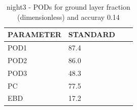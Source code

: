 \begin{table}[p!]
\begin{center}
\begin{tabular}{|l|l|l|l|}
\hline
\multicolumn{1}{|c|}{\cellcolor[HTML]{C0C0C0}\textbf{PARAMETER}} & \multicolumn{1}{c|}{\cellcolor[HTML]{C0C0C0}\textbf{STANDARD}} \\
\hline
\cellcolor[HTML]{C0C0C0}POD1  & 87.4                                \\
\cellcolor[HTML]{C0C0C0}POD2  & 86.0                                \\
\cellcolor[HTML]{C0C0C0}POD3  & 48.3                                \\
\cellcolor[HTML]{C0C0C0}PC    & 77.5                                  \\
\cellcolor[HTML]{C0C0C0}EBD   & 17.2                                 \\
\hline
\end{tabular}
\caption{night3 - PODs for ground layer fraction (dimensionless) and accuray 0.14}
\label{tab:podglf0.14:night3}
\end{center}
\end{table}
